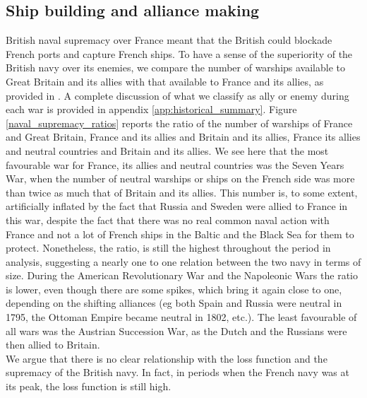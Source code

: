\documentclass[12pt,a4paper,notitlepage,english]{article}
\begin{document}
\subsection{Ship building and alliance making}
British naval supremacy over France meant that the British could blockade French ports and capture French ships.
To have a sense of the superiority of the British navy over its enemies, we compare the number of warships available to Great Britain and its allies with that available to France and its allies, as provided in \cite{Modelski1988}. 
A complete discussion of what we classify as ally or enemy during each war is provided in appendix \ref{app:historical_summary}. 
Figure \ref{naval_supremacy_ratios} reports the ratio of the number of warships of France and Great Britain, France and its allies and Britain and its allies, France its allies and neutral countries and Britain and its allies.
We see here that the most favourable war for France, its allies and neutral countries was the Seven Years War, when the number of neutral warships or ships on the French side was more than twice as much that of Britain and its allies. This number is, to some extent, artificially inflated by the fact that Russia and Sweden were allied to France in this war, despite the fact that there was no real common naval action with France and not a lot of French ships in the Baltic and the Black Sea for them to protect. Nonetheless, the ratio, is still the highest throughout the period in analysis, suggesting a nearly one to one relation between the two navy in terms of size. 
During the American Revolutionary War and the Napoleonic Wars the ratio is lower, even though there are some spikes, which bring it again close to one, depending on the shifting alliances (eg both Spain and Russia were neutral in 1795, the Ottoman Empire became neutral in 1802, etc.). 
The least favourable of all wars was the Austrian Succession War, as the Dutch and the Russians were then allied to Britain.  \\
We argue that there is no clear relationship with the loss function and the supremacy of the British navy. In fact, in periods when the French navy was at its peak, the loss function is still high. 
\end{document}
